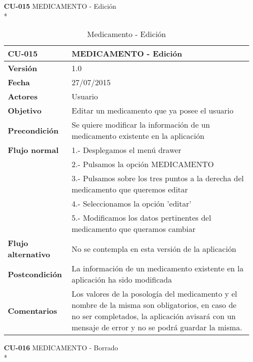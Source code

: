 \documentclass[../pfc.tex]{subfiles}
\begin{document}
		\textbf{CU-015}	MEDICAMENTO - Edición\\*
		
		\begin{table}[H]
			\centering
			\begin{tabular}[t]{|p{3cm}|p{9.5cm}|}
				\hline \textbf{CU-015} & \textbf{MEDICAMENTO - Edición} \\*
				\hline\hline \textbf{Versión} & 1.0 \\*
				\hline\hline \textbf{Fecha} & 27/07/2015 \\*
				\hline\textbf{Actores} 	& Usuario\\*
				\hline \textbf{Objetivo} & Editar un medicamento que ya posee el usuario\\* 			
				\hline \textbf{Precondición} & Se quiere modificar la información de un medicamento existente en la aplicación\\* 
				\hline \textbf{Flujo normal} & 1.- Desplegamos el menú drawer \\* 
				& 2.- Pulsamos la opción MEDICAMENTO\\*	
				& 3.- Pulsamos sobre los tres puntos a la derecha del medicamento que queremos editar\\*	
				& 4.- Seleccionamos la opción 'editar'\\*	
				& 5.- Modificamos los datos pertinentes del medicamento que queramos cambiar\\*	
				\hline \textbf{Flujo alternativo} & No se contempla en esta versión de la aplicación\\* 
				\hline \textbf{Postcondición} & La información de un medicamento existente en la aplicación ha sido modificada \\* 
				\hline \textbf{Comentarios}   & Los valores de la posología del medicamento y el nombre de la misma son obligatorios, en caso de no ser completados, la aplicación avisará con un mensaje de error y no se podrá guardar la misma.\\*
				\hline
			\end{tabular}
			\caption{Medicamento - Edición}
			\label{tabla:caso015}
		\end{table}
		
		\clearpage
		
		\textbf{CU-016}	MEDICAMENTO - Borrado\\*
		
\end{document}
